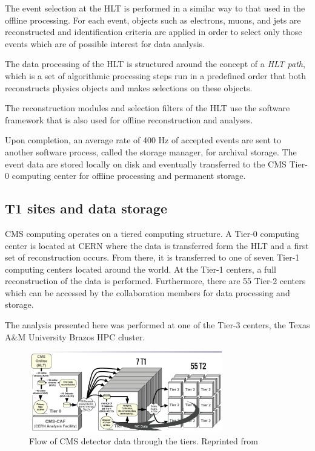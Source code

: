 The event selection at the HLT is performed in a similar way to that used in the offline processing. For each event, objects such as electrons, muons, and jets are reconstructed and identification criteria are applied in order to select only those events which are of possible interest for data analysis.

The data processing of the HLT is structured around the concept of a \textit{HLT path}, which is a set of algorithmic processing steps run in a predefined order that both reconstructs physics objects and makes selections on these objects. 

The reconstruction modules and selection filters of the HLT use the software framework that is also used for offline reconstruction and analyses.

Upon completion, an average rate of 400 Hz of accepted events are sent to another software process, called the storage manager, for archival storage. The event data are stored locally on disk and eventually transferred to the CMS Tier-0 computing center for offline processing and permanent storage.


\subsection{T1 sites and data storage}

CMS computing operates on a tiered computing structure. A Tier-0 computing center is located at CERN where the data is transferred form the HLT and a first set of reconstruction occurs. From there, it is transferred to one of seven Tier-1 computing centers located around the world. At the Tier-1 centers, a full reconstruction of the data is performed. Furthermore, there are 55 Tier-2 centers which can be accessed by the collaboration members for data processing and storage.

The analysis presented here was performed at one of the Tier-3 centers, the Texas A$\&$M University Brazos HPC cluster. 

 \begin{figure}[H]
 	\centering
 	\includegraphics[width=0.75\textwidth]{figures/dataflowtiers_MC.png}
 	\singlespace
 	\caption{Flow of CMS detector data through the tiers. Reprinted from \cite{CMSdatatier}}
 	\label{fig:datatier}
 \end{figure}

